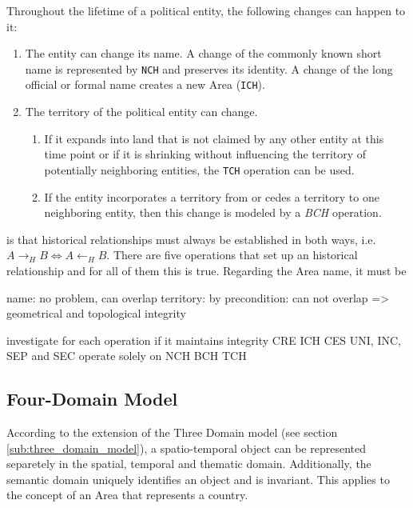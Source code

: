 Throughout the lifetime of a political entity, the following changes can happen to it:
\begin{enumerate}
  \item The entity can change its name. A change of the commonly known short name is represented by \texttt{NCH} and preserves its identity. A change of the long official or formal name creates a new Area (\texttt{ICH}).
  \item The territory of the political entity can change.
  \begin{enumerate}
    \item If it expands into land that is not claimed by any other entity at this time point or if it is shrinking without influencing the territory of potentially neighboring entities, the \texttt{TCH} operation can be used.
    \item If the entity incorporates a territory from or cedes a territory to one neighboring entity, then this change is modeled by a \emph{BCH} operation.
  \end{enumerate}
\end{enumerate}



is that historical relationships must always be established in both ways, i.e. $A \rightarrow_H B \Leftrightarrow A \leftarrow_H B $. There are five operations that set up an historical relationship and for all of them this is true. Regarding the Area name, it must be



name: no problem, can overlap
territory: by precondition: can not overlap
=> geometrical and topological integrity

investigate for each operation if it maintains integrity
CRE
ICH
CES
UNI, INC, SEP and SEC operate solely on
NCH
BCH
TCH




\subsection{Four-Domain Model} %
\label{sub:four_domain_model}

According to the extension of the Three Domain model (see section \ref{sub:three_domain_model}), a spatio-temporal object can be represented separetely in the spatial, temporal and thematic domain. Additionally, the semantic domain uniquely identifies an object and is invariant. This applies to the concept of an Area that represents a country.

